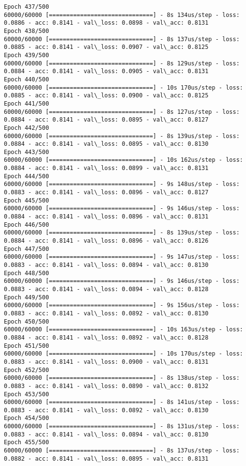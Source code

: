 \documentclass[11pt]{article}
\begin{document}
\begin{Verbatim}[commandchars=\\\{\}]
Epoch 437/500
60000/60000 [==============================] - 8s 134us/step - loss: 0.0886 - acc: 0.8141 - val\_loss: 0.0898 - val\_acc: 0.8131
Epoch 438/500
60000/60000 [==============================] - 8s 137us/step - loss: 0.0885 - acc: 0.8141 - val\_loss: 0.0907 - val\_acc: 0.8125
Epoch 439/500
60000/60000 [==============================] - 8s 129us/step - loss: 0.0884 - acc: 0.8141 - val\_loss: 0.0905 - val\_acc: 0.8131
Epoch 440/500
60000/60000 [==============================] - 10s 170us/step - loss: 0.0885 - acc: 0.8141 - val\_loss: 0.0900 - val\_acc: 0.8125
Epoch 441/500
60000/60000 [==============================] - 8s 127us/step - loss: 0.0884 - acc: 0.8141 - val\_loss: 0.0895 - val\_acc: 0.8127
Epoch 442/500
60000/60000 [==============================] - 8s 139us/step - loss: 0.0884 - acc: 0.8141 - val\_loss: 0.0895 - val\_acc: 0.8130
Epoch 443/500
60000/60000 [==============================] - 10s 162us/step - loss: 0.0884 - acc: 0.8141 - val\_loss: 0.0899 - val\_acc: 0.8131
Epoch 444/500
60000/60000 [==============================] - 9s 148us/step - loss: 0.0883 - acc: 0.8141 - val\_loss: 0.0896 - val\_acc: 0.8127
Epoch 445/500
60000/60000 [==============================] - 9s 146us/step - loss: 0.0884 - acc: 0.8141 - val\_loss: 0.0896 - val\_acc: 0.8131
Epoch 446/500
60000/60000 [==============================] - 8s 139us/step - loss: 0.0884 - acc: 0.8141 - val\_loss: 0.0896 - val\_acc: 0.8126
Epoch 447/500
60000/60000 [==============================] - 9s 147us/step - loss: 0.0883 - acc: 0.8141 - val\_loss: 0.0894 - val\_acc: 0.8130
Epoch 448/500
60000/60000 [==============================] - 9s 146us/step - loss: 0.0883 - acc: 0.8141 - val\_loss: 0.0894 - val\_acc: 0.8128
Epoch 449/500
60000/60000 [==============================] - 9s 156us/step - loss: 0.0883 - acc: 0.8141 - val\_loss: 0.0892 - val\_acc: 0.8130
Epoch 450/500
60000/60000 [==============================] - 10s 163us/step - loss: 0.0884 - acc: 0.8141 - val\_loss: 0.0892 - val\_acc: 0.8128
Epoch 451/500
60000/60000 [==============================] - 10s 170us/step - loss: 0.0883 - acc: 0.8141 - val\_loss: 0.0900 - val\_acc: 0.8131
Epoch 452/500
60000/60000 [==============================] - 8s 138us/step - loss: 0.0883 - acc: 0.8141 - val\_loss: 0.0890 - val\_acc: 0.8132
Epoch 453/500
60000/60000 [==============================] - 8s 141us/step - loss: 0.0883 - acc: 0.8141 - val\_loss: 0.0892 - val\_acc: 0.8130
Epoch 454/500
60000/60000 [==============================] - 8s 131us/step - loss: 0.0883 - acc: 0.8141 - val\_loss: 0.0894 - val\_acc: 0.8130
Epoch 455/500
60000/60000 [==============================] - 8s 137us/step - loss: 0.0882 - acc: 0.8141 - val\_loss: 0.0895 - val\_acc: 0.8131

\end{Verbatim}
\end{document}
